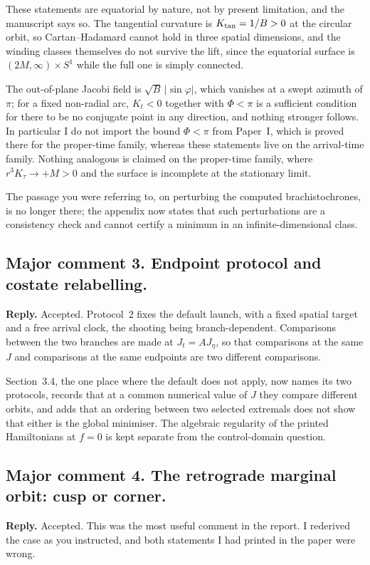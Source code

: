 \documentclass{article}
\begin{document}
These statements are equatorial by nature, not by present limitation, and the
manuscript says so. The tangential curvature is \(K_{\rm tan} = 1/B>0\) at the
circular orbit, so Cartan--Hadamard cannot hold in three spatial dimensions, and
the winding classes themselves do not survive the lift, since the equatorial
surface is \((2M,\infty)\times S^1\) while the full one is simply connected.

The out-of-plane Jacobi field is \(\sqrt{B}\,|\sin \varphi|\), which vanishes at a
swept azimuth of \(\pi\); for a fixed non-radial arc, \(K_t <0\) together with
\(\Phi < \pi\) is a sufficient condition for there to be no conjugate point in any
direction, and nothing stronger follows. In particular I do not import the bound
\(\Phi < \pi\) from Paper~I, which is proved there for the proper-time family,
whereas these statements live on the arrival-time family. Nothing analogous is
claimed on the proper-time family, where \(r^3K_\tau\to +M >0\) and the surface is
incomplete at the stationary limit.

The passage you were referring to, on perturbing the computed brachistochrones, is
no longer there; the appendix now states that such perturbations are a consistency
check and cannot certify a minimum in an infinite-dimensional class.

\subsection{Major comment 3. Endpoint protocol and costate relabelling.}
\textbf{Reply.} Accepted. Protocol~2 fixes the default launch, with a fixed spatial
target and a free arrival clock, the shooting being branch-dependent. Comparisons
between the two branches are made at \(J_t=AJ_{\eta}\), so that comparisons at the
same \(J\) and comparisons at the same endpoints are two different comparisons.

Section~3.4, the one place where the default does not apply, now names its two
protocols, records that at a common numerical value of \(J\) they compare different
orbits, and adds that an ordering between two selected extremals does not show that
either is the global minimiser. The algebraic regularity of the printed
Hamiltonians at \(f = 0\) is kept separate from the control-domain question.

\subsection{Major comment 4. The retrograde marginal orbit: cusp or corner.}
\textbf{Reply.} Accepted. This was the most useful comment in the report. I
rederived the case as you instructed, and both statements I had printed in the
paper were wrong.
\end{document}
